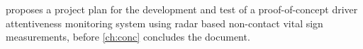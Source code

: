 \documentclass[11pt, parskip=half*,twoside=false]{scrbook}
\begin{document}
 proposes a project plan for the development and test of a proof-of-concept driver attentiveness monitoring system using radar based non-contact vital sign measurements, before \cref{ch:conc} concludes the document.

%
\end{document}
